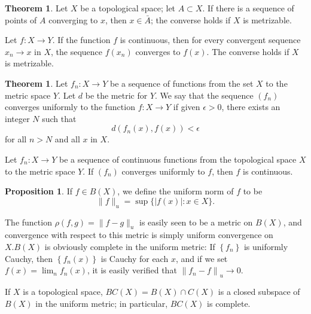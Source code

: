 \documentclass[12pt,a4paper]{book}
\theoremstyle{definition}
\newtheorem{theo}[defn]{Theorem}
\newtheorem{prop}[defn]{Proposition}
\begin{document}
\begin{theo}
    Let $X$ be a topological space; let $A \subset X$. If there is a sequence of points of $A$ converging to $x$, then $x \in \bar{A}$; the converse holds if $X$ is metrizable.

    Let $f: X \rightarrow Y$. If the function $f$ is continuous, then for every convergent sequence $x_n \rightarrow x$ in $X$, the sequence $f\left(x_n\right)$ converges to $f(x)$. The converse holds if $X$ is metrizable.
\end{theo}
\begin{theo}
    Let $f_n: X \rightarrow Y$ be a sequence of functions from the set $X$ to the metric space $Y$. Let $d$ be the metric for $Y$. We say that the sequence $\left(f_n\right)$ converges uniformly to the function $f: X \rightarrow Y$ if given $\epsilon>0$, there exists an integer $N$ such that
    $$
        d\left(f_n(x), f(x)\right)<\epsilon
    $$
    for all $n>N$ and all $x$ in $X$.

    Let $f_n: X \rightarrow Y$ be a sequence of continuous functions from the topological space $X$ to the metric space $Y$. If $\left(f_n\right)$ converges uniformly to $f$, then $f$ is continuous.
\end{theo}
\begin{prop}
    If $f \in B(X)$, we define the uniform norm of $f$ to be
    $$
        \|f\|_u=\sup \{|f(x)|: x \in X\} .
    $$

    The function $\rho(f, g)=\|f-g\|_u$ is easily seen to be a metric on $B(X)$, and convergence with respect to this metric is simply uniform convergence on $X . B(X)$ is obviously complete in the uniform metric: If $\left\{f_n\right\}$ is uniformly Cauchy, then $\left\{f_n(x)\right\}$ is Cauchy for each $x$, and if we set $f(x)=\lim _n f_n(x)$, it is easily verified that $\left\|f_n-f\right\|_u \rightarrow 0$.

    If $X$ is a topological space, $B C(X)=B(X)\cap C(X)$ is a closed subspace of $B(X)$ in the uniform metric; in particular, $B C(X)$ is complete.
\end{prop}
\end{document}
